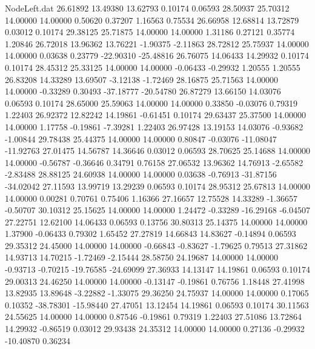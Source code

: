 \begin{filecontents}{NodeLeft.dat}
  26.61892   13.49380   13.62793     0.10174    0.06593   28.50937   25.70312   14.00000   14.00000    0.50620    0.37207    1.16563    0.75534
  26.66958   12.68814   13.72879     0.03012    0.10174   29.38125   25.71875   14.00000   14.00000    1.31186    0.27121    0.35774    1.20846
  26.72018   13.96362   13.76221    -1.90375   -2.11863   28.72812   25.75937   14.00000   14.00000    0.03638    0.23779  -22.90310  -25.48816
  26.76075   14.06433   14.29932     0.10174    0.10174   28.45312   25.33125   14.00000   14.00000   -0.06433   -0.29932    1.20555    1.20555
  26.83208   14.33289   13.69507    -3.12138   -1.72469   28.16875   25.71563   14.00000   14.00000   -0.33289    0.30493  -37.18777  -20.54780
  26.87279   13.66150   14.03076     0.06593    0.10174   28.65000   25.59063   14.00000   14.00000    0.33850   -0.03076    0.79319    1.22403
  26.92372   12.82242   14.19861    -0.61451    0.10174   29.63437   25.37500   14.00000   14.00000    1.17758   -0.19861   -7.39281    1.22403
  26.97428   13.19153   14.03076    -0.93682   -1.00844   29.78438   25.44375   14.00000   14.00000    0.80847   -0.03076  -11.08047  -11.92763
  27.01475   14.56787   14.36646     0.03012    0.06593   28.70625   25.14688   14.00000   14.00000   -0.56787   -0.36646    0.34791    0.76158
  27.06532   13.96362   14.76913    -2.65582   -2.83488   28.88125   24.60938   14.00000   14.00000    0.03638   -0.76913  -31.87156  -34.02042
  27.11593   13.99719   13.29239     0.06593    0.10174   28.95312   25.67813   14.00000   14.00000    0.00281    0.70761    0.75406    1.16366
  27.16657   12.75528   14.33289    -1.36657   -0.50707   30.10312   25.15625   14.00000   14.00000    1.24472   -0.33289  -16.29168   -6.04507
  27.22751   12.62100   14.06433     0.06593    0.13756   30.80313   25.14375   14.00000   14.00000    1.37900   -0.06433    0.79302    1.65452
  27.27819   14.66843   14.83627    -0.14894    0.06593   29.35312   24.45000   14.00000   14.00000   -0.66843   -0.83627   -1.79625    0.79513
  27.31862   14.93713   14.70215    -1.72469   -2.15444   28.58750   24.19687   14.00000   14.00000   -0.93713   -0.70215  -19.76585  -24.69099
  27.36933   14.13147   14.19861     0.06593    0.10174   29.00313   24.46250   14.00000   14.00000   -0.13147   -0.19861    0.76756    1.18448
  27.41998   13.82935   13.89648    -3.22882   -1.33075   29.36250   24.75937   14.00000   14.00000    0.17065    0.10352  -38.78301  -15.98440
  27.47051   13.12454   14.19861     0.06593    0.10174   30.11563   24.55625   14.00000   14.00000    0.87546   -0.19861    0.79319    1.22403
  27.51086   13.72864   14.29932    -0.86519    0.03012   29.93438   24.35312   14.00000   14.00000    0.27136   -0.29932  -10.40870    0.36234

\end{filecontents}
